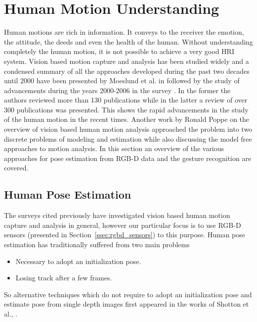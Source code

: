\section{Human Motion Understanding} %
 Human motions are rich in information. It conveys to the receiver the emotion, the attitude, the deeds and even the health of the human. Without understanding completely the human motion, it is not possible to achieve a very good HRI system.  Vision based motion capture and analysis has been studied widely and a condensed summary of all the approaches developed during the past two decades until 2000 have been presented by Moeslund et al. in \cite{Moeslund2001231} followed by the study of advancements during the years 2000-2006 in the survey \cite{Moeslund200690}. In the former the authors reviewed more than 130 publications while in the latter a review of over 300 publications was presented. This shows the rapid advancements in the study of the human motion in the recent times. Another work by Ronald Poppe \cite{Poppe20074} on the overview of vision based human motion analysis approached the problem into two discrete problems of modeling and estimation while also discussing the model free approaches to motion analysis. In this section an overview of the various approaches for pose estimation from RGB-D data and the gesture recognition are covered.
\subsection{Human Pose Estimation}
\label{sec:humanpose}
The surveys \cite{Moeslund2001231}\cite{Moeslund200690}\cite{Poppe20074} cited previously have investigated vision based human motion capture and analysis in general, however our particular focus is to use RGB-D sensors (presented in Section~\ref{ssec:rgbd_sensors}) to this purpose. Human pose estimation has traditionally suffered from two main problems
\begin{itemize}
\item Necessary to adopt an initialization pose.
\item Losing track after a few frames.
\end{itemize}
So alternative techniques which do not require to adopt an initialization pose and estimate pose from single depth images first appeared in the works of Shotton et al., \cite{shotton2013real}.
